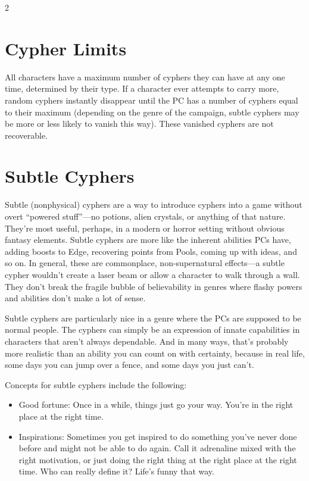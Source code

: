 \begin{multicols}{2}
\section{Cypher Limits}

All characters have a maximum number of cyphers they can have at any one time, determined by their type. If a character ever attempts to carry more, random cyphers instantly disappear until the PC has a number of cyphers equal to their maximum (depending on the genre of the campaign, subtle cyphers may be more or less likely to vanish this way). These vanished cyphers are not recoverable.

\section{Subtle Cyphers}

Subtle (nonphysical) cyphers are a way to introduce cyphers into a game without overt “powered stuff”—no potions, alien crystals, or anything of that nature. They’re most useful, perhaps, in a modern or horror setting without obvious fantasy elements. Subtle cyphers are more like the inherent abilities PCs have, adding boosts to Edge, recovering points from Pools, coming up with ideas, and so on. In general, these are commonplace, non-supernatural effects—a subtle cypher wouldn’t create a laser beam or allow a character to walk through a wall. They don’t break the fragile bubble of believability in genres where flashy powers and abilities don’t make a lot of sense.

Subtle cyphers are particularly nice in a genre where the PCs are supposed to be normal people. The cyphers can simply be an expression of innate capabilities in characters that aren’t always dependable. And in many ways, that’s probably more realistic than an ability you can count on with certainty, because in real life, some days you can jump over a fence, and some days you just can’t.

Concepts for subtle cyphers include the following:

\begin{itemize}
\item Good fortune: Once in a while, things just go your way. You’re in the right place at the right time.

\item Inspirations: Sometimes you get inspired to do something you’ve never done before and might not be able to do again. Call it adrenaline mixed with the right motivation, or just doing the right thing at the right place at the right time. Who can really define it? Life’s funny that way.


\end{itemize}
\end{multicols}
